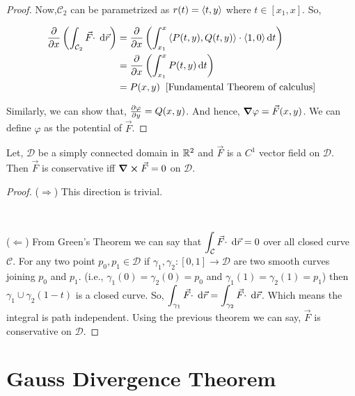 \documentclass[../Analysis-3.tex]{subfiles}
\begin{document}
\begin{proof}
  Now,$\mathcal{C}_2$ can be parametrized as $r(t) = \left\langle {t}, {y} \right\rangle$ where $t \in [x_1,x]$. So,

  \begin{align*}
    \pdv{x} \left(\int_{\mathcal{C}_2} {\vec{F} \cdot } \hspace{0.1cm} \dd {\vec{r}}\right) & = \pdv{x} \left( \int_{x_1}^x \left\langle {P(t,y)}, {Q(t,y)} \right\rangle \cdot \left\langle {1}, {0} \right\rangle \dd{t} \right) \\
                                                                       & = \pdv{x} \left( \int_{x_1}^x P(t,y) \dd{t} \right)                                \\
                                                                       & = P(x,y) \hspace{0.2cm} \text{[Fundamental Theorem of calculus]}
  \end{align*}

  Similarly, we can show that, $\pdv{\varphi}{y} = Q(x,y)$. And hence, $\grad\varphi = \vec{F}(x,y)$. We can define $\varphi$ as the potential of $\vec{F}$.
\end{proof}

\begin{Thm}{}{}
  Let, $\mathcal{D}$ be a simply connected domain in $\mathbb{R}^2$ and $\vec{F}$ is a $C^1$ vector field on $\mathcal{D}$. Then $\vec{F}$ is conservative iff $\curl \vec{F} = 0$ on $\mathcal{D}$.
\end{Thm}

\begin{proof}
  ($\Rightarrow$) This direction is trivial.

  \

  ($\Leftarrow$) From Green's Theorem we can say that $ \displaystyle\int_{\mathcal{C}} {\vec{F} \cdot } \hspace{0.1cm} \dd {\vec{r}} = 0$ over all closed curve $\mathcal{C}$. For any two point $p_0,p_1 \in \mathcal{D}$ if $\gamma_1, \gamma_2 : [0,1] \to \mathcal{D}$ are two smooth curves joining $p_0$ and $p_1$. (i.e., $\gamma_1(0) = \gamma_2 (0) = p_0$ and $\gamma_1(1) = \gamma_2(1) = p_1$) then $\gamma_1 \cup \gamma_2(1-t)$ is a closed curve. So, $ \displaystyle\int_{\gamma_1} {\vec{F} \cdot } \hspace{0.1cm} \dd {\vec{r}}  = \displaystyle\int_{\gamma_2} {\vec{F} \cdot } \hspace{0.1cm} \dd {\vec{r}}$. Which means the integral is path independent. Using the previous theorem we can say, $\vec{F}$ is conservative on $\mathcal{D}$.
\end{proof}

\section{Gauss Divergence Theorem}
\end{document}

